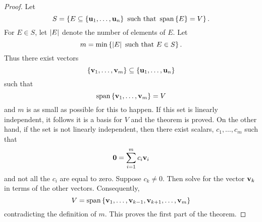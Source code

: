 \begin{proof}
  Let
  \begin{equation*}
    S=\set{E\subseteq \set{\vect{u}_{1},\ldots,\vect{u}_{n}}\text{ such that }%
      \sspan\set{E} =V}.
  \end{equation*}
  For $E\in S$, let $\left|E\right|$ denote the number of elements of
  $E$. Let
  \begin{equation*}
    m= \min \set{\abs{E}\text{ such that }E\in S}.
  \end{equation*}
  Thus there exist vectors
  \begin{equation*}
    \set{\vect{v}_{1},\ldots,\vect{v}_{m}}\subseteq \set{\vect{u}_{1},\ldots,%
      \vect{u}_{n}}
  \end{equation*}
  such that
  \begin{equation*}
    \sspan\set{\vect{v}_{1},\ldots,\vect{v}_{m}} =V
  \end{equation*}
  and $m$ is as small as possible for this to happen. If this set is
  linearly independent, it follows it is a basis for $V$ and the
  theorem is proved. On the other hand, if the set is not linearly
  independent, then there exist scalars, $c_{1},\ldots,c_{m}$ such
  that
  \begin{equation*}
    \mbox{\bf 0}=\sum_{i=1}^{m}c_{i}\mbox{\bf v}_{i}
  \end{equation*}
  and not all the $c_{i}$ are equal to zero. Suppose $c_{k}\neq
  0$. Then solve for the vector $\mbox{\bf v}_{k}$ in terms of the other
  vectors.  Consequently,
  \begin{equation*}
    V=\sspan\set{\vect{v}_{1},\ldots,\vect{v}_{k-1},\vect{v}
      _{k+1},\ldots,\vect{v}_{m}}
  \end{equation*}
  contradicting the definition of $m$. This proves the first part of the
  theorem.


\end{proof}

